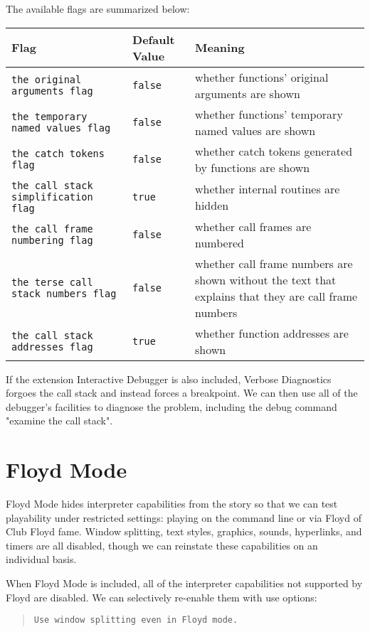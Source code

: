 \documentclass{book}
\newcommand{\impatiencechapter}[1]{\chapter{#1}\addcontentsline{toi}{chapter}{#1}}
\begin{document}
\begin{quote}
  
\end{quote}

The available flags are summarized below:

\hbox{}
\begin{longtable}{llp{6cm}}
  \midrule
  \textbf{Flag}&\textbf{Default Value}&\textbf{Meaning}\\
  \midrule
  \texttt{the original arguments flag}&\texttt{false}&whether functions' original arguments are shown\\
  \texttt{the temporary named values flag}&\texttt{false}&whether functions' temporary named values are shown\\
  \texttt{the catch tokens flag}&\texttt{false}&whether catch tokens generated by functions are shown\\
  \texttt{the call stack simplification flag}&\texttt{true}&whether internal routines are hidden\\
  \texttt{the call frame numbering flag}&\texttt{false}&whether call frames are numbered\\
  \texttt{the terse call stack numbers flag}&\texttt{false}&whether call frame numbers are shown without the text that explains that they are call frame numbers\\
  \texttt{the call stack addresses flag}&\texttt{true}&whether function addresses are shown\\
  \midrule
\end{longtable}

If the extension Interactive Debugger is also included, Verbose Diagnostics
forgoes the call stack and instead forces a breakpoint.  We can then use all of
the debugger's facilities to diagnose the problem, including the debug command
"examine the call stack".

\impatiencechapter{Floyd Mode}
\label{floyd-mode}

Floyd Mode hides interpreter capabilities from the story so that we can test
playability under restricted settings: playing on the command line or via Floyd
of Club Floyd fame.  Window splitting, text styles, graphics, sounds,
hyperlinks, and timers are all disabled, though we can reinstate these
capabilities on an individual basis.

When Floyd Mode is included, all of the interpreter capabilities not supported
by Floyd are disabled.  We can selectively re-enable them with use options:

\begin{quote}
  \lstinline @Use window splitting even in Floyd mode.@
\end{quote}
\end{document}
